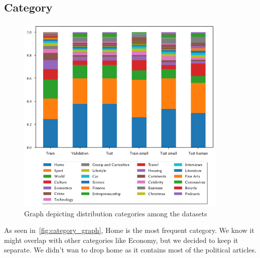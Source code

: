 \subsection{Category}
\begin{figure}[H]
    \centering
    \includegraphics[width=0.9\textwidth]{img/tasks_graph/category.pdf}
    \caption{Graph depicting distribution categories among the datasets}
    \label{fig:category_graph}
\end{figure}
As seen in~\autoref{fig:category_graph}, Home is the most frequent category.
We know it might overlap with other categories like Economy, but we decided to keep it separate.
We didn't wan to drop home as it contains most of the political articles.

